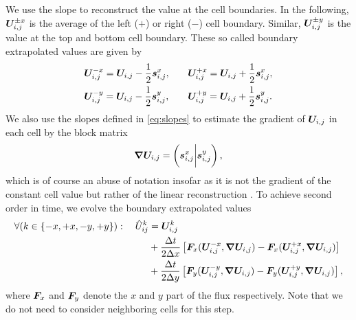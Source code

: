 We use the slope to reconstruct the value at the cell boundaries.
In the following, $\bm{U}_{i,j}^{\pm x}$ is the average of the left ($+$) or right ($-$) cell boundary.
Similar, $\bm{U}_{i,j}^{\pm y}$ is the value at the top and bottom cell boundary.
These so called boundary extrapolated values are given by
\newcommand{\extrapolatedCellAvg}[3][i,j]{\cellAvg[#1]^{#3 #2} = \cellAvg #3 \frac{1}{2} \slope{#2}}%
\begin{equation}
\begin{alignedat}{2}
& \extrapolatedCellAvg{x}{-} , \qquad && \extrapolatedCellAvg{x}{+}, \\
& \extrapolatedCellAvg{y}{-} , \qquad && \extrapolatedCellAvg{y}{+}.
\end{alignedat}
\end{equation}
We also use the slopes defined in \cref{eq:slopes} to estimate the gradient of $\bm{U}_{i,j}$ in each cell by the block matrix
\begin{equation}
  \label{eq:muscl-gradient}
  \gradCellAvg = \left( \slope{x} \bigg\rvert \slope{y} \right),
\end{equation}
which is of course an abuse of notation insofar as it is not the gradient of the constant cell value but rather of the linear reconstruction .
To achieve second order in time, we evolve the boundary extrapolated values
\newcommand{\evolvedCellAvg}[2][i,j]{\hat{U}_{#1}^{#2}}
\begin{equation}\label{eq:muscl-time-evolution}
  \begin{split}
    \forall (k \in \{-x, +x, -y, +y \} ): \quad  \hat{U}_{ij}^k &= \cellAvg^k
\\&+ \frac{\Delta t}{2 \Delta x} \left[ \fluxX(\cellAvg^{-x}, \gradCellAvg) - \fluxX(\cellAvg^{+x}, \gradCellAvg) \right]
\\&+ \frac{\Delta t}{2 \Delta y} \left[ \fluxY(\cellAvg^{-y}, \gradCellAvg) - \fluxY(\cellAvg^{+y}, \gradCellAvg) \right],
  \end{split}
\end{equation}
where $\bm{F}_x$ and $\bm{F}_y$ denote the $x$ and $y$ part of the flux respectively.
Note that we do not need to consider neighboring cells for this step.

